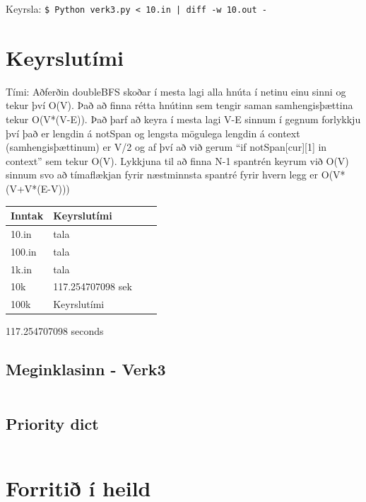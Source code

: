 \documentclass{article}
\begin{document}
 	Keyrsla: \texttt {\$ Python verk3.py < 10.in | diff -w 10.out -}


\section {Keyrslutími}

Tími: Aðferðin doubleBFS skoðar í mesta lagi alla hnúta í netinu einu sinni og tekur því O(V). Það að finna rétta hnútinn sem tengir saman samhengisþættina tekur O(V*(V-E)). Það þarf að keyra í mesta lagi V-E sinnum í gegnum forlykkju því það er lengdin á notSpan og lengsta mögulega lengdin á context (samhengisþættinum) er V/2 og af því að við gerum “if notSpan[cur][1] in context” sem tekur O(V).
Lykkjuna til að finna N-1 spantrén keyrum við O(V) sinnum svo að tímaflækjan fyrir  næstminnsta spantré fyrir hvern legg er O(V*(V+V*(E-V)))


\begin{center}
    \begin{tabular}{| l | l | l | l |}
    \hline
    Inntak & Keyrslutími\\ \hline
    10.in & tala\\ \hline
    100.in & tala\\ \hline
    1k.in & tala\\ \hline
    10k & 117.254707098 sek\\ \hline
    100k & Keyrslutími\\ \hline

    \end{tabular}
\end{center}
117.254707098 seconds


\subsection{Meginklasinn - Verk3}
\inputminted{python}{verk3.py}


\subsection{Priority dict}
\inputminted{python}{priority_dict.py}


\pagebreak

\section {Forritið í heild}

\inputminted[mathescape,
               linenos,
               numbersep=10pt,
               gobble=0,
               frame=lines,
               framesep=2mm]{python}{../verk3.py}
\end{document}
